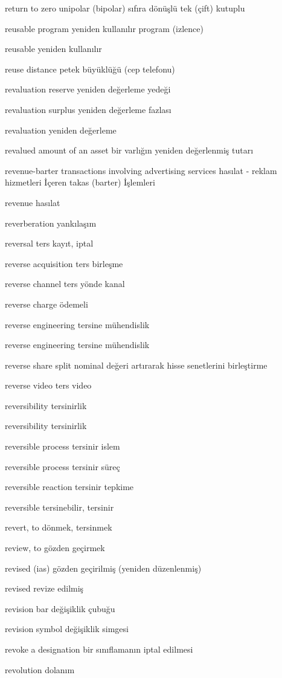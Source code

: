\documentclass[12pt,fleqn]{article}\usepackage{../../common}
\begin{document}
return to zero unipolar (bipolar) sıfıra dönüşlü tek (çift) kutuplu

reusable program yeniden kullanılır program (izlence)

reusable yeniden kullanılır

reuse distance petek büyüklüğü (cep telefonu)

revaluation reserve yeniden değerleme yedeği

revaluation surplus yeniden değerleme fazlası

revaluation yeniden değerleme

revalued amount of an asset bir varlığın yeniden değerlenmiş tutarı

revenue-barter transactions involving advertising services hasılat - reklam hizmetleri İçeren takas (barter) İşlemleri

revenue hasılat

reverberation yankılaşım

reversal ters kayıt, iptal

reverse acquisition ters birleşme

reverse channel ters yönde kanal

reverse charge ödemeli

reverse engineering tersine mühendislik

reverse engineering tersine mühendislik

reverse share split nominal değeri artırarak hisse senetlerini birleştirme

reverse video ters video

reversibility tersinirlik

reversibility tersinirlik

reversible process tersinir islem

reversible process tersinir süreç

reversible reaction tersinir tepkime

reversible tersinebilir, tersinir

revert, to dönmek, tersinmek

review, to gözden geçirmek

revised (ias) gözden geçirilmiş (yeniden düzenlenmiş)

revised revize edilmiş

revision bar değişiklik çubuğu

revision symbol değişiklik simgesi

revoke a designation bir sınıflamanın iptal edilmesi

revolution dolanım
\end{document}

